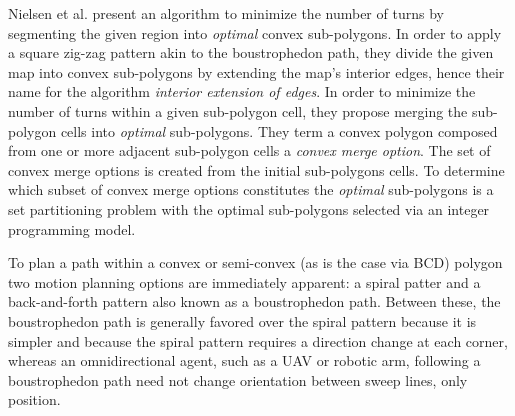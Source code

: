 Nielsen et al. present an algorithm to minimize the number of turns by segmenting the given region into \textit{optimal} convex sub-polygons\cite{IntEdgeExt}.
In order to apply a square zig-zag pattern akin to the boustrophedon path, they divide the given map into convex sub-polygons by extending the map's interior edges, hence their name for the algorithm \textit{interior extension of edges}.
In order to minimize the number of turns within a given sub-polygon cell, they propose merging the sub-polygon cells into \textit{optimal} sub-polygons.
They term a convex polygon composed from one or more adjacent sub-polygon cells a \textit{convex merge option}.
The set of convex merge options is created from the initial sub-polygons cells.
To determine which subset of convex merge options constitutes the \textit{optimal} sub-polygons is a set partitioning problem with the optimal sub-polygons selected via an integer programming model.

To plan a path within a convex or semi-convex (as is the case via BCD) polygon two motion planning options are immediately apparent: a spiral patter and a back-and-forth pattern also known as a boustrophedon path.
Between these, the boustrophedon path is generally favored over the spiral pattern because it is simpler and because the spiral pattern requires a direction change at each corner, whereas an omnidirectional agent, such as a UAV or robotic arm, following a boustrophedon path need not change orientation between sweep lines, only position.

